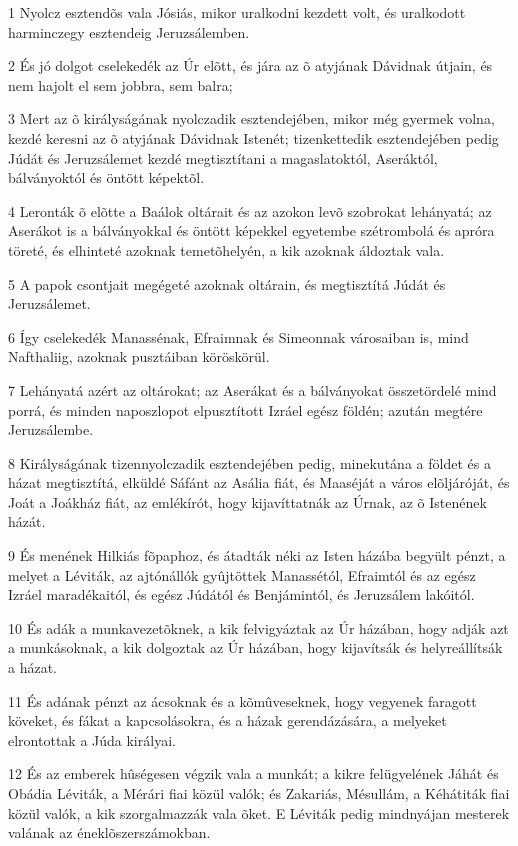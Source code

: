 \par 1 Nyolcz esztendõs vala Jósiás, mikor uralkodni kezdett volt, és uralkodott harminczegy esztendeig Jeruzsálemben.
\par 2 És jó dolgot cselekedék az Úr elõtt, és jára az õ atyjának Dávidnak útjain, és nem hajolt el sem jobbra, sem balra;
\par 3 Mert az õ királyságának nyolczadik esztendejében, mikor még gyermek volna, kezdé keresni az õ atyjának Dávidnak Istenét; tizenkettedik esztendejében pedig Júdát és Jeruzsálemet kezdé megtisztítani a magaslatoktól, Aseráktól, bálványoktól és öntött képektõl.
\par 4 Leronták õ elõtte a Baálok oltárait és az azokon levõ szobrokat lehányatá; az Aserákot is a bálványokkal és öntött képekkel egyetembe szétrombolá és apróra töreté, és elhinteté azoknak  temetõhelyén, a kik azoknak áldoztak vala.
\par 5 A papok csontjait megégeté azoknak oltárain, és megtisztítá Júdát és Jeruzsálemet.
\par 6 Így cselekedék Manassénak, Efraimnak és Simeonnak városaiban is, mind Nafthaliig, azoknak pusztáiban köröskörül.
\par 7 Lehányatá azért az oltárokat; az Aserákat és a bálványokat összetördelé mind porrá, és minden naposzlopot elpusztított Izráel egész földén; azután megtére Jeruzsálembe.
\par 8 Királyságának tizennyolczadik esztendejében pedig, minekutána a földet és a házat megtisztítá, elküldé Sáfánt az Asália fiát, és Maaséját a város elõljáróját, és Joát a Joákház fiát, az emlékírót, hogy kijavíttatnák az Úrnak, az õ Istenének házát.
\par 9 És menének Hilkiás fõpaphoz, és átadták néki az Isten házába begyült pénzt, a melyet a Léviták, az ajtónállók gyûjtöttek Manassétól, Efraimtól és az egész Izráel maradékaitól, és egész Júdától és Benjámintól, és Jeruzsálem lakóitól.
\par 10 És adák a munkavezetõknek, a kik felvigyáztak az Úr házában, hogy adják azt a munkásoknak, a kik dolgoztak az Úr házában, hogy kijavítsák és helyreállítsák a házat.
\par 11 És adának pénzt az ácsoknak és a kõmûveseknek, hogy vegyenek faragott köveket, és fákat a kapcsolásokra, és a házak gerendázására, a melyeket elrontottak a Júda királyai.
\par 12 És az emberek hûségesen végzik vala a munkát; a kikre felügyelének Jáhát és Obádia Léviták, a Mérári fiai közül valók; és Zakariás, Mésullám, a Kéhátiták fiai közül valók, a kik szorgalmazzák vala õket. E Léviták pedig mindnyájan mesterek valának az éneklõszerszámokban.
